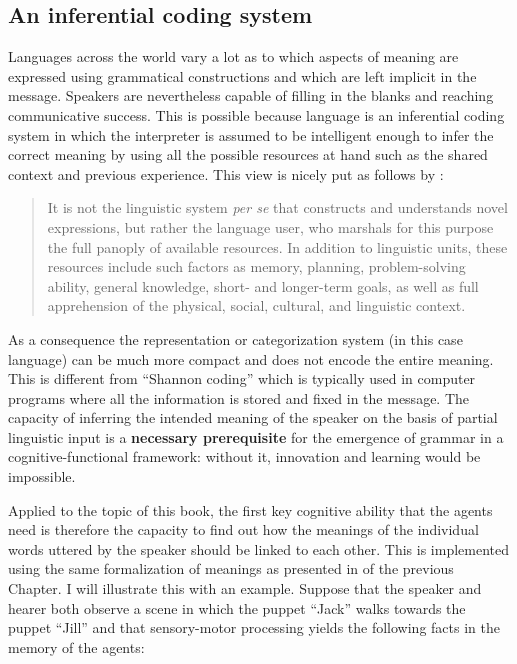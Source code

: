 \subsection{An inferential coding system}

Languages across the world vary a lot as to which aspects of meaning are expressed using grammatical constructions and which are left implicit in the message. Speakers are nevertheless capable of filling in the blanks and reaching communicative success. This is possible because language is an inferential coding system \citep{sperber86relevance} in which the interpreter is assumed to be intelligent enough to infer the correct meaning by using all the possible resources at hand such as the shared context and previous experience. This view is nicely put as follows by \citet[9]{langacker00dynamic}:

\begin{quote}
It is not the linguistic system {\em per se} that constructs and understands novel expressions, but rather the language user, who marshals for this purpose the full panoply of available resources. In addition to linguistic units, these resources include such factors as memory, planning, problem-solving ability, general knowledge, short- and longer-term goals, as well as full apprehension of the physical, social, cultural, and linguistic context.
\end{quote}

As a consequence the representation or categorization system (in this case language) can be much more compact and does not encode the entire meaning. This is different from ``Shannon coding'' which is typically used in computer programs where all the information is stored and fixed in the message. The capacity of inferring the intended meaning of the speaker on the basis of partial linguistic input is a {\bfseries necessary prerequisite} for the emergence of grammar in a cognitive-functional framework: without it, innovation and learning would be impossible.

Applied to the topic of this book, the first key cognitive ability that the agents need is therefore the capacity to find out how the meanings of the individual words uttered by the speaker should be linked to each other. This is implemented using the same formalization of meanings as presented in  of the previous Chapter. I will illustrate this with an example. Suppose that the speaker and hearer both observe a scene in which the puppet ``Jack'' walks towards the puppet ``Jill'' and that sensory-motor processing yields the following facts in the memory of the agents:

